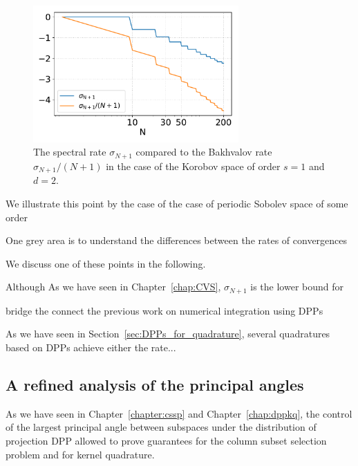 \documentclass[twoside,11pt]{book}
\numberwithin{theorem}{chapter}
\numberwithin{definition}{chapter}
\numberwithin{proposition}{chapter}
\numberwithin{corollary}{chapter}
\numberwithin{example}{chapter}
\numberwithin{lemma}{chapter}
\numberwithin{assumption}{chapter}
\numberwithin{equation}{chapter}
\numberwithin{figure}{chapter}
\begin{document}
\begin{figure}[h]
\centering
\includegraphics[width= 0.7\textwidth]{img/conclusion/Bakhvalov_for_Korobov_2D_s_1.pdf}
\caption{The spectral rate $\sigma_{N+1}$ compared to the Bakhvalov rate $\sigma_{N+1}/(N+1)$ in the case of the Korobov space of order $s=1$ and $d =2$. \label{fig:conclusion_bakhvalov_for_korobov}}
\end{figure}


We illustrate this point by the case of the case of periodic Sobolev space of some order 


One grey area is to understand the differences between the rates of convergences 


We discuss one of these points in the following.

Although 
As we have seen in Chapter~\ref{chap:CVS}, $\sigma_{N+1}$ is the lower bound for 


bridge the connect the previous work on numerical integration using DPPs
 


As we have seen in Section~\ref{sec:DPPs_for_quadrature}, several quadratures based on DPPs achieve either the rate...


\subsection{A refined analysis of the principal angles}

As we have seen in Chapter~\ref{chapter:cssp} and Chapter~\ref{chap:dppkq}, the control of the largest principal angle between subspaces under the distribution of projection DPP allowed to prove guarantees for the column subset selection problem and for kernel quadrature. 
\end{document}
